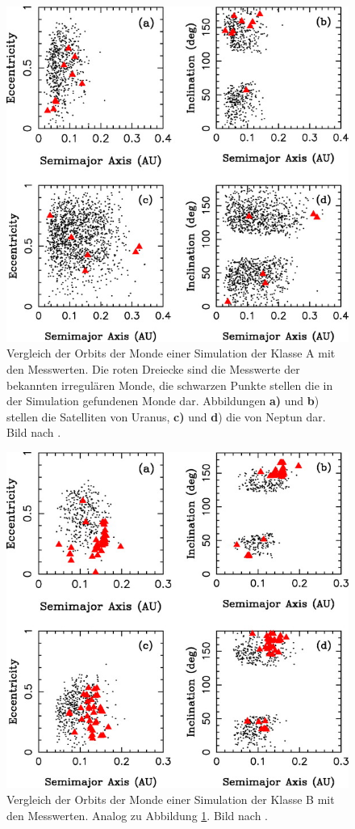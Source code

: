 \documentclass[12pt,a4paper,twoside]{article}
\begin{document}
\begin{figure}[tbn]
\centering
\includegraphics[scale=2]{img/Nesvorny2007-5.jpg}
\caption{Vergleich der Orbits der Monde einer Simulation der Klasse A mit den Messwerten. Die roten Dreiecke sind die Messwerte der bekannten irregulären Monde, die schwarzen Punkte stellen die in der Simulation gefundenen Monde dar. Abbildungen \textbf{a)} und \textbf{b}) stellen die Satelliten von Uranus, \textbf{c)} und \textbf{d}) die von Neptun dar. Bild nach \cite{Nesvorny2007}.}
\label{fig:KlasseA_Mondorbitale}
\end{figure}
\begin{figure}[tbn]
\centering
\includegraphics[scale=2]{img/Nesvorny2007-7.jpg}
\caption{Vergleich der Orbits der Monde einer Simulation der Klasse B mit den Messwerten. Analog zu Abbildung \ref{fig:KlasseA_Mondorbitale}. Bild nach \cite{Nesvorny2007}.}
\label{fig:KlasseB_Mondorbitale}
\end{figure}
\end{document}
